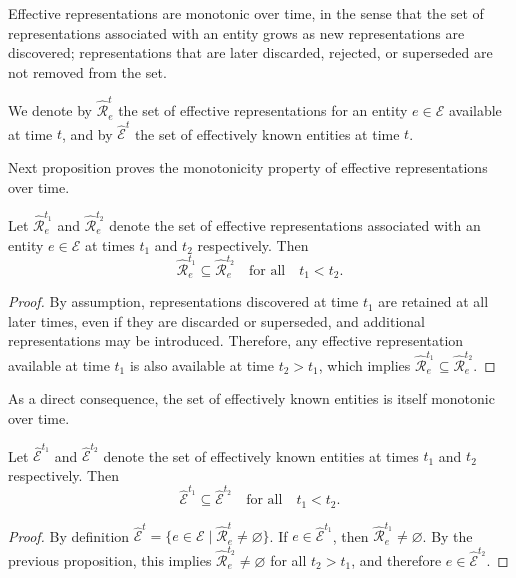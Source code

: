 Effective representations are monotonic over time, in the sense that the set of representations associated with an entity grows as new representations are discovered; representations that are later discarded, rejected, or superseded are not removed from the set.

\begin{notation}
We denote by $\hat{\mathcal{R}}_e^t$ the set of effective representations for an entity $e \in \mathcal{E}$ available at time $t$, and by $\hat{\mathcal{E}}^t$ the set of effectively known entities at time $t$.
\end{notation}

Next proposition proves the monotonicity property of effective representations over time.

\begin{proposition}
Let $\hat{\mathcal{R}}_e^{t_1}$ and $\hat{\mathcal{R}}_e^{t_2}$ denote the set of effective representations associated with an entity $e \in \mathcal{E}$ at times $t_1$ and $t_2$ respectively. Then
\[
\hat{\mathcal{R}}_e^{t_1} \subseteq \hat{\mathcal{R}}_e^{t_2}
\quad \text{for all} \quad t_1 < t_2.
\]
\end{proposition}
\begin{proof}
By assumption, representations discovered at time $t_1$ are retained at all later times, even if they are discarded or superseded, and additional representations may be introduced. Therefore, any effective representation available at time $t_1$ is also available at time $t_2 > t_1$, which implies $\hat{\mathcal{R}}_e^{t_1} \subseteq \hat{\mathcal{R}}_e^{t_2}$.
\end{proof}

As a direct consequence, the set of effectively known entities is itself monotonic over time.

\begin{proposition}
Let $\hat{\mathcal{E}}^{t_1}$ and $\hat{\mathcal{E}}^{t_2}$ denote the set of effectively known entities at times $t_1$ and $t_2$ respectively. Then
\[
\hat{\mathcal{E}}^{t_1} \subseteq \hat{\mathcal{E}}^{t_2}
\quad \text{for all} \quad t_1 < t_2.
\]
\end{proposition}
\begin{proof}
By definition $\hat{\mathcal{E}}^t = \{ e \in \mathcal{E} \mid \hat{\mathcal{R}}_e^t \neq \varnothing \}$. If $e \in \hat{\mathcal{E}}^{t_1}$, then $\hat{\mathcal{R}}_e^{t_1} \neq \varnothing$. By the previous proposition, this implies $\hat{\mathcal{R}}_e^{t_2} \neq \varnothing$ for all $t_2 > t_1$, and therefore $e \in \hat{\mathcal{E}}^{t_2}$.
\end{proof}

